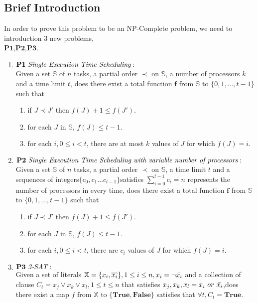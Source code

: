 
\subsection{Brief Introduction}
In order to prove this problem to be an NP-Complete problem, we need to introduction 3 new problems,\\$\textbf{P1,P2,P3}$.
\begin{enumerate}
    \item $\textbf{P1}~\emph{Single Execution Time Scheduling}:$ \\ 
    Given a set $\mathbb{S}$ of $n$ tasks, a partial order $\prec$ on $\mathbb{S}$,  a number of processors $k$ and a time limit $t$, does there exist 
    a total function $\mathbf{f}$ from $\mathbb{S}$ to $\{0, 1,..., t - 1\}$ such that
    \begin{enumerate}
        \item if $J\prec J'$ then  $f(J)+1\le f(J')$.
        \item for each $J$ in $\mathbb{S}$, $f(J)  \le t-1$.
        \item for each $i, 0\le i< t$, there are at most $k$ values of $J$ for which $f(J)=i$.
    \end{enumerate}
    \item $\textbf{P2}~\emph{Single Execution Time Scheduling with variable number of processors}:$ \\ 
    Given a set $\mathbb{S}$ of $n$ tasks, a partial order $\prec$ on $\mathbb{S}$, a time limit $t$ and a sequences of integers$\{c_0,c_1\dots c_{t-1}\}$satisfies $\sum\limits_{i=0}^{t-1}c_i=n$ represents the number of processors in every time, does there exist 
    a total function $\mathbf{f}$ from $\mathbb{S}$ to $\{0, 1,..., t - 1\}$ such that
    \begin{enumerate}
        \item if $J\prec J'$ then  $f(J)+1\le f(J')$.
        \item for each $J$ in $\mathbb{S}$, $f(J) \le t-1$.
        \item for each $i, 0\le i< t$, there are $c_i$ values of $J$ for which $f(J)=i$.
    \end{enumerate}
    \item $\textbf{P3}~\emph{3-SAT}:$\\
    Given a set of literals $\mathbb{X}=\{x_i,\overline{x_i}\}, 1 \le i \le n,x_i=\neg\Bar{x_i}$ and a collection of clause
$C_t=x_j\vee x_k\vee x_l,1\le t\le n$ that satisfies $x_j,x_k,x_l=x_i~or~\Bar{x_i}$,does there exist a map $f$ from $\mathbb{X}$ to  $\{\textbf{True},\textbf{False}\}$ satisfies that $\forall t, C_t=\textbf{True}$. 
\end{enumerate}
